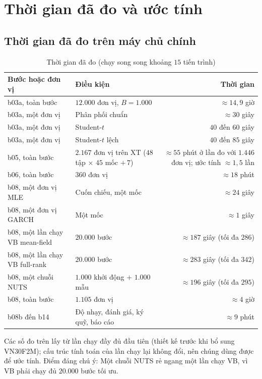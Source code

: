\documentclass[12pt,a4paper]{article}
\theoremstyle{remark}
\newcommand{\XT}{\mathrm{XT}}
\begin{document}
\section{Thời gian đã đo và ước tính}

\subsection{Thời gian đã đo trên máy chủ chính}

\begin{table}[h]
\centering
\caption{Thời gian đã đo (chạy song song khoảng $15$ tiến trình)}\label{tab:daDo}
\begin{tabular}{@{}lp{6.2cm}r@{}}
\toprule
\textbf{Bước hoặc đơn vị} & \textbf{Điều kiện} & \textbf{Thời gian} \\
\midrule
b03a, toàn bước & $12.000$ đơn vị, $B=1.000$ & $\approx14{,}9$ giờ \\
b03a, một đơn vị & Phân phối chuẩn & $\approx30$ giây \\
b03a, một đơn vị & Student-$t$ & $40$ đến $60$ giây \\
b03a, một đơn vị & Student-$t$ lệch & $40$ đến $85$ giây \\
b05, toàn bước & $2.167$ đơn vị trên $\XT$ ($48$ tập $\times$ $45$ mốc $+\,7$) & $\approx55$ phút ở lần đo với $1.446$ đơn vị; ước tính $\approx1{,}5$ lần \\
b06, toàn bước & $360$ đơn vị & $\approx18$ phút \\
b08, một đơn vị MLE & Cuốn chiếu, một mốc & $\approx24$ giây \\
b08, một đơn vị GARCH & Một mốc & $\approx1$ giây \\
b08, một lần chạy VB mean-field & $20.000$ bước & $\approx187$ giây (tối đa $286$) \\
b08, một lần chạy VB full-rank & $20.000$ bước & $\approx283$ giây (tối đa $342$) \\
b08, một chuỗi NUTS & $1.000$ khởi động $+$ $1.000$ mẫu & $\approx196$ giây (tối đa $295$) \\
b08, toàn bước & $1.105$ đơn vị & $\approx4$ giờ \\
b08b đến b14 & Độ nhạy, đánh giá, ký quỹ, báo cáo & $\approx9$ phút \\
\bottomrule
\end{tabular}
\end{table}

Các số đo trên lấy từ lần chạy đầy đủ đầu tiên (thiết kế trước khi bổ sung VN30F2M); cấu trúc tính toán của lần chạy lại không đổi, nên chúng dùng được để ước tính. Điểm đáng chú ý: Một chuỗi NUTS rẻ ngang một lần chạy VB, vì VB phải chạy đủ $20.000$ bước tối ưu.
\end{document}
